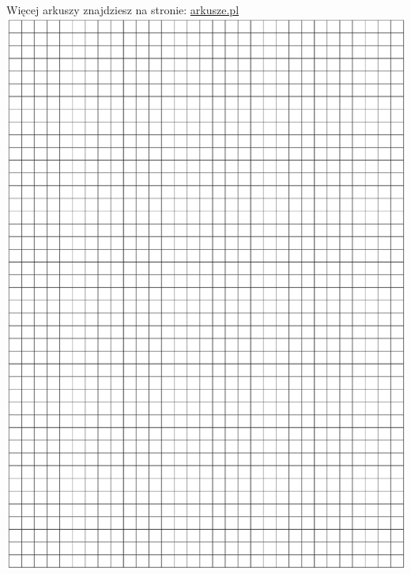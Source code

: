 \documentclass[10pt]{article}
\begin{document}
Więcej arkuszy znajdziesz na stronie: \href{http://arkusze.pl}{arkusze.pl}\\
\includegraphics[max width=\textwidth, center]{2024_11_21_8206013b40ecc9b11a30g-08}
\end{document}
